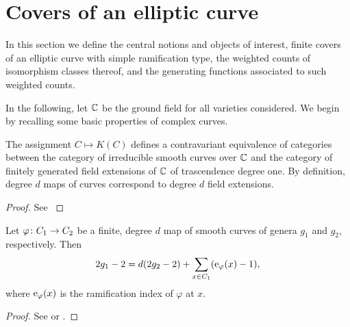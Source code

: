 \section{Covers of an elliptic curve} \label{sec:covers-definitions}

In this section we define the central notions and objects of interest, \ie finite covers of an elliptic curve with simple ramification type, the weighted counts of isomorphism classes thereof, and the generating functions associated to such weighted counts.

In the following, let $\mathbb{C}$ be the ground field for all varieties considered. We begin by recalling some basic properties of complex curves.

\begin{prop} \label{prop:curves-to-fields}
The assignment $C\mapsto K(C)$ defines a contravariant equivalence of categories between the category of irreducible smooth curves over $\mathbb{C}$ 
and the 
category of finitely generated field extensions of $\mathbb{C}$ of trascendence degree one. By definition, degree $d$ maps of curves correspond 
to degree $d$ field extensions.
\end{prop}

\begin{proof}
 See \cite[pp.20-22]{Silverman2009}
\end{proof}

\begin{prop} \label{prop:hurwitz}
 Let $\varphi \colon C_1 \to C_2$ be a finite, degree $d$ map of smooth curves of genera $g_1$ and $g_2$, respectively. Then \[2g_1-2 = d(2g_2-2) + 
\sum_{x\in C_1}(\operatorname{e}_{\varphi}(x)-1),\] where $\operatorname{e}_\varphi(x)$ is the ramification index of $\varphi$ at $x$.
\end{prop}

\begin{proof}
 See \cite[Thm.~5.9]{Silverman2009} or \cite[7.2.1]{Lamotke2005}.
\end{proof}

